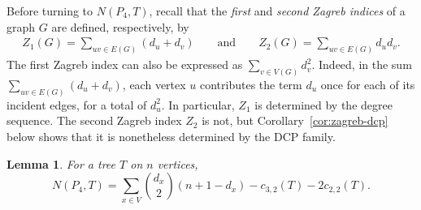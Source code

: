 \documentclass[12pt,reqno]{amsart}
\newtheorem{lem}[thm]{Lemma}
\theoremstyle{definition}
\begin{document}
Before turning to $N(P_4,T)$, recall that the \emph{first} and \emph{second Zagreb indices} of a graph $G$ are defined, respectively, by
\begin{align*}
    Z_1(G) = \sum_{uv\in E(G)} (d_u+d_v) \qquad \text{and} \qquad Z_2(G) =  \sum_{uv\in E(G)} d_u d_v.
\end{align*}
The first Zagreb index can also be expressed as $\sum_{v\in V(G)} d_v^2$. Indeed, in the sum $\sum_{uv\in E(G)}(d_u+d_v)$, each vertex $u$ contributes the term $d_u$ once for each of its incident edges, for a total of $d_u^2$. In particular, $Z_1$ is determined by the degree sequence. The second Zagreb index $Z_2$ is not, but Corollary~\ref{cor:zagreb-dcp} below shows that it is nonetheless determined by the DCP family.

\begin{lem}\label{lem:P4-count}
For a tree $T$ on $n$ vertices,
\[
N(P_4, T) = \sum_{x\in V}\binom{d_x}{2}(n+1-d_x) - c_{3,2}(T) - 2c_{2,2}(T).
\]
\end{lem}
\end{document}
